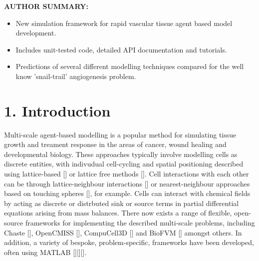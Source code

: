 \documentclass[superscriptaddress, a4paper]{article}
\newenvironment{authorsummary}
{\begin{framed} \begin{center} \begin{minipage}{0.9\textwidth} \noindent}
{\end{minipage} \end{center} \end{framed}}
\begin{document}
\vspace{1.5cm}

\begin{authorsummary}

\textbf{AUTHOR SUMMARY:}

\begin{itemize}
 \item New simulation framework for rapid vascular tissue agent based
 model development.
 \item Includes unit-tested code, detailed API documentation and tutorials.
 \item Predictions of several different modelling techniques compared for the well know 'snail-trail' angiogenesis problem.
\end{itemize}

\end{authorsummary}

\newpage

\setcounter{tocdepth}{3}
\tableofcontents

\newpage
\doublespacing

\section{1. Introduction}
\label{sec:introduction}

Multi-scale agent-based modelling is a popular method for simulating tissue growth and treament response in the areas of cancer, wound healing and developmental biology. These approaches typically involve modelling cells as discrete entities, with indivudual cell-cycling and spatial positioning described using lattice-based [] or lattice free methods []. Cell interactions with each other can be through lattice-neighbour interactions [] or nearest-neighbour approaches based on touching spheres [], for example. Cells can interact with chemical fields by acting as discrete or distrbuted sink or source terms in partial differential equations arising from mass balances. There now exists a range of flexible, open-source frameworks for implementing the described multi-scale problems, including Chaste [], OpenCMISS [], CompuCell3D [] and BioFVM [] amongst others. In addition, a variety of bespoke, problem-specific, frameworks have been developed, often using MATLAB [][][]. 
\end{document}
